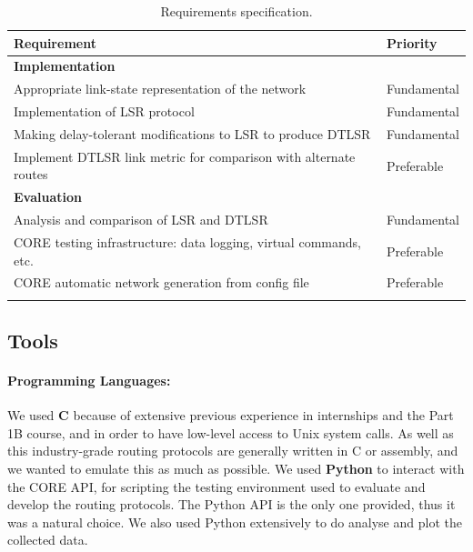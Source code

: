 \documentclass[withindex,glossary,openany]{cam-thesis}
\begin{document}
\begin{table}[H]
\centering
\begin{tabular}{@{}p{}l@{}}\toprule
\Large\textbf{Requirement} & \Large\textbf{Priority} \\
\midrule
\midrule
\textbf{Implementation} & \\
\midrule
Appropriate link-state representation of the network & Fundamental \\\addlinespace[0.2em]
Implementation of LSR protocol & Fundamental \\\addlinespace[0.2em]
Making delay-tolerant modifications to LSR to produce DTLSR & Fundamental \\\addlinespace[0.2em]
Implement DTLSR link metric for comparison with alternate routes & Preferable \\\addlinespace[0.2em]
\midrule
\midrule
\textbf{Evaluation} & \\
\midrule
Analysis and comparison of LSR and DTLSR & Fundamental \\\addlinespace[0.2em]
CORE testing infrastructure: data logging, virtual commands, etc. & Preferable \\\addlinespace[0.2em]
CORE automatic network generation from config file & Preferable \\\addlinespace[0.2em]
\bottomrule
\end{tabular}
\caption{Requirements specification.}
\label{table:requirements}
\end{table}

\subsection{Tools}

\paragraph{Programming Languages:}

We used \textbf{C} because of extensive previous experience in internships and the Part 1B course, and in order to have low-level access to Unix system calls. As well as this industry-grade routing protocols are generally written in C or assembly, and we wanted to emulate this as much as possible. We used \textbf{Python} to interact with the CORE API, for scripting the testing environment used to evaluate and develop the routing protocols. The Python API is the only one provided, thus it was a natural choice. We also used Python extensively to do analyse and plot the collected data.
\end{document}
